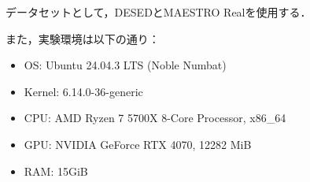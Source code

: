 \documentclass[main]{subfiles}
\begin{document}

データセットとして，DESEDとMAESTRO Realを使用する．\par
また，実験環境は以下の通り：
\begin{itemize}
    \item OS: Ubuntu 24.04.3 LTS (Noble Numbat) 
    \item Kernel: 6.14.0-36-generic
	\item CPU: AMD Ryzen 7 5700X 8-Core Processor, x86\_64
	\item GPU: NVIDIA GeForce RTX 4070, 12282 MiB
	\item RAM: 15GiB
\end{itemize}
\end{document}
